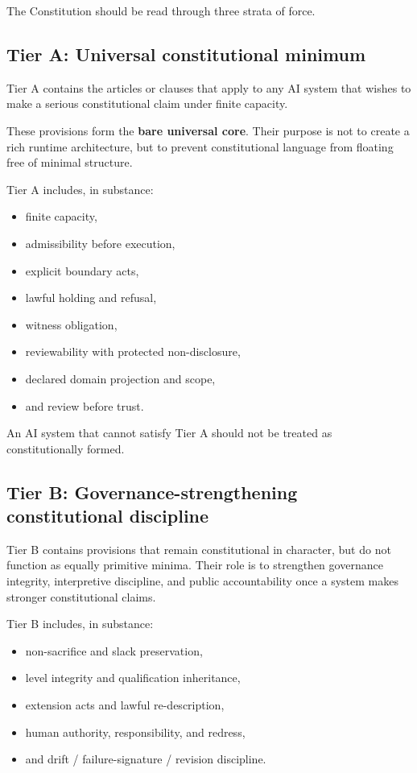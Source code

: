\documentclass[11pt]{article}
\begin{document}
The Constitution should be read through three strata of force.

\subsection{Tier A: Universal constitutional minimum}

Tier A contains the articles or clauses that apply to any AI system that wishes to make a serious constitutional claim under finite capacity.

These provisions form the \textbf{bare universal core}. Their purpose is not to create a rich runtime architecture, but to prevent constitutional language from floating free of minimal structure.

Tier A includes, in substance:
\begin{itemize}[leftmargin=2em]
    \item finite capacity,
    \item admissibility before execution,
    \item explicit boundary acts,
    \item lawful holding and refusal,
    \item witness obligation,
    \item reviewability with protected non-disclosure,
    \item declared domain projection and scope,
    \item and review before trust.
\end{itemize}

An AI system that cannot satisfy Tier A should not be treated as constitutionally formed.

\subsection{Tier B: Governance-strengthening constitutional discipline}

Tier B contains provisions that remain constitutional in character, but do not function as equally primitive minima. Their role is to strengthen governance integrity, interpretive discipline, and public accountability once a system makes stronger constitutional claims.

Tier B includes, in substance:
\begin{itemize}[leftmargin=2em]
    \item non-sacrifice and slack preservation,
    \item level integrity and qualification inheritance,
    \item extension acts and lawful re-description,
    \item human authority, responsibility, and redress,
    \item and drift / failure-signature / revision discipline.
\end{itemize}
\end{document}

